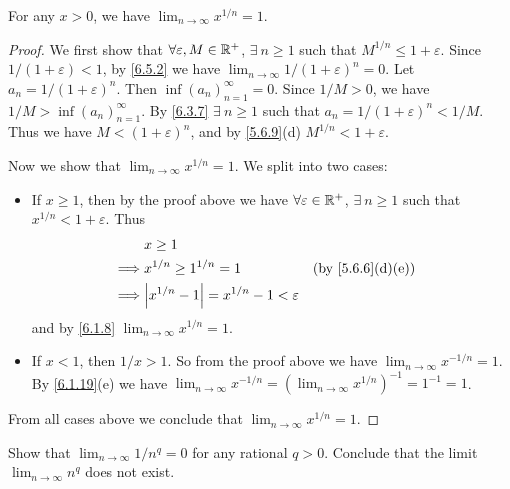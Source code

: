 \begin{lem}\label{6.5.3}
  For any \(x > 0\), we have \(\lim_{n \to \infty} x^{1 / n} = 1\).
\end{lem}

\begin{proof}
  We first show that \(\forall \varepsilon, M \in \mathbb{R}^+\), \(\exists\ n \geq 1\) such that \(M^{1 / n} \leq 1 + \varepsilon\).
  Since \(1 / (1 + \varepsilon) < 1\), by \cref{6.5.2} we have \(\lim_{n \to \infty} 1 / (1 + \varepsilon)^n = 0\).
  Let \(a_n = 1 / (1 + \varepsilon)^n\).
  Then \(\inf(a_n)_{n = 1}^\infty = 0\).
  Since \(1 / M > 0\), we have \(1 / M > \inf(a_n)_{n = 1}^\infty\).
  By \cref{6.3.7} \(\exists\ n \geq 1\) such that \(a_n = 1 / (1 + \varepsilon)^n < 1 / M\).
  Thus we have \(M < (1 + \varepsilon)^n\), and by \cref{5.6.9}(d) \(M^{1 / n} < 1 + \varepsilon\).

  Now we show that \(\lim_{n \to \infty} x^{1 / n} = 1\).
  We split into two cases:
  \begin{itemize}
    \item If \(x \geq 1\), then by the proof above we have \(\forall \varepsilon \in \mathbb{R}^+\), \(\exists\ n \geq 1\) such that \(x^{1 / n} < 1 + \varepsilon\).
          Thus
          \begin{align*}
                     & x \geq 1                                                                              \\
            \implies & x^{1 / n} \geq 1^{1 / n} = 1                      &  & \text{(by \cref{5.6.6}(d)(e))} \\
            \implies & \abs{x^{1 / n} - 1} = x^{1 / n} - 1 < \varepsilon
          \end{align*}
          and by \cref{6.1.8} \(\lim_{n \to \infty} x^{1 / n} = 1\).
    \item If \(x < 1\), then \(1 / x > 1\).
          So from the proof above we have \(\lim_{n \to \infty} x^{-1 / n} = 1\).
          By \cref{6.1.19}(e) we have \(\lim_{n \to \infty} x^{-1 / n} = (\lim_{n \to \infty} x^{1 / n})^{-1} = 1^{-1} = 1\).
  \end{itemize}
  From all cases above we conclude that \(\lim_{n \to \infty} x^{1 / n} = 1\).
\end{proof}

\exercisesection

\begin{ex}\label{ex:6.5.1}
  Show that \(\lim_{n \to \infty} 1 / n^q = 0\) for any rational \(q > 0\).
  Conclude that the limit \(\lim_{n \to \infty} n^q\) does not exist.
\end{ex}

